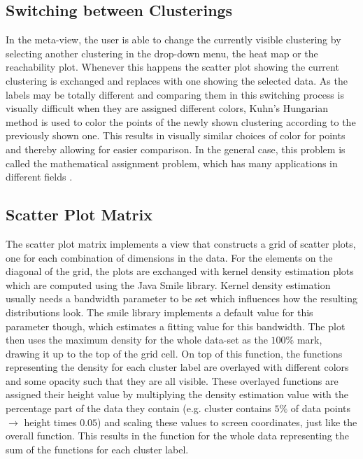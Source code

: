 \documentclass[
	a4paper,
	english,
	twoside,
	openright,               
	11pt                            
	]{report}
\begin{document}
\subsection{Switching between Clusterings}

In the meta-view, the user is able to change the currently visible clustering by selecting another clustering in the drop-down menu, the heat map or the reachability plot. Whenever this happens the scatter plot showing the current clustering is exchanged and replaces with one showing the selected data. As the labels may be totally different and comparing them in this switching process is visually difficult when they are assigned different colors, Kuhn’s Hungarian method \cite{Kuhn2010} is used to color the points of the newly shown clustering according to the previously shown one. This results in visually similar choices of color for points and thereby allowing for easier comparison. In the general case, this problem is called the mathematical assignment problem, which has many applications in different fields \cite{Kuhn2010}.

\subsection{Scatter Plot Matrix}

The scatter plot matrix implements a view that constructs a grid of scatter plots, one for each combination of dimensions in the data. For the elements on the diagonal of the grid, the plots are exchanged with kernel density estimation plots which are computed using the Java Smile \cite{javasmile} library. Kernel density estimation usually needs a bandwidth parameter to be set which influences how the resulting distributions look. The smile library implements a default value for this parameter though, which estimates a fitting value for this bandwidth. The plot then uses the maximum density for the whole data-set as the $100\% $ mark, drawing it up to the top of the grid cell. On top of this function, the functions representing the density for each cluster label are overlayed with different colors and some opacity such that they are all visible. These overlayed functions are assigned their height value by multiplying the density estimation value with the percentage part of the data they contain (e.g. cluster contains $5\% $ of data points $\rightarrow$ height times $0.05$) and scaling these values to screen coordinates, just like the overall function. This results in the function for the whole data representing the sum of the functions for each cluster label.
\end{document}
